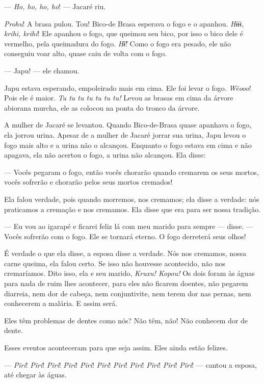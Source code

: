--- \textit{Ho, ho, ho, ho}! --- Jacaré riu. 

\textit{Prohu}! A brasa pulou. Tou! Bico-de Brasa esperava o fogo e
o apanhou. \textit{Hɨɨɨ, krihi, krihi}! Ele apanhou o fogo, que queimou seu
bico, por isso o bico dele é vermelho, pela queimadura do
fogo. \textit{Hɨ̃}! Como o fogo era pesado, ele não conseguiu voar alto,
quase caiu de volta com o fogo. 

--- Japu! --- ele chamou.

Japu estava esperando, empoleirado mais em cima. Ele foi levar o fogo.
\textit{Wẽooo}! Pois ele é maior. \textit{Tu tu tu tu tu tu tu!} Levou as brasas em cima
da árvore abiorana murcha, ele as colocou na ponta do tronco da árvore. 

A mulher de Jacaré se levantou. Quando Bico-de-Brasa quase apanhava o
fogo, ela jorrou urina. Apesar de a mulher de Jacaré jorrar sua urina,
Japu levou o fogo mais alto e a urina não o alcançou. Enquanto
o fogo estava em cima e não apagava, ela não acertou o fogo, a urina não
alcançou. Ela disse:

--- Vocês pegaram o fogo, então vocês chorarão quando cremarem os seus
mortos, vocês sofrerão e chorarão pelos seus mortos cremados! 

Ela falou verdade, pois quando morremos, nos cremamos; ela disse a
verdade: nós praticamos a cremação e nos cremamos. Ela disse que era
para ser nossa tradição. 

--- Eu vou ao igarapé e ficarei feliz lá com meu marido para sempre ---
disse. --- Vocês sofrerão com o fogo. Ele se tornará eterno. O fogo
derreterá seus olhos! 

É verdade o que ela disse, a esposa disse a verdade. Nós nos cremamos,
nossa carne queima, ela falou certo. Se isso não houvesse acontecido,
não nos cremaríamos. Dito isso, ela e seu marido, \textit{Kruxu! Kopou!} Os dois
foram às águas para nada de ruim lhes acontecer, para eles não ficarem
doentes, não pegarem diarreia, nem dor de cabeça, nem conjuntivite, nem
terem dor nas pernas, nem conhecerem a malária. E assim será. 

Eles têm problemas de dentes como nós? Não têm, não! Não conhecem dor de
dente. 

Esses eventos aconteceram para que seja assim. Eles ainda estão
felizes. 

--- \textit{Pĩri}! \textit{Pĩri}! \textit{Pĩri}! \textit{Pĩri}! \textit{Pĩri}! \textit{Pĩri}! \textit{Pĩri}! \textit{Pĩri}! \textit{Pĩri}! \textit{Pĩri}! \textit{Pĩri}!
--- cantou a esposa, até chegar às águas. 

